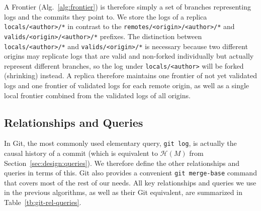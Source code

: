 \documentclass[9pt, oneside]{article}   	%
\begin{document}
A Frontier (Alg.~\ref{alg:frontier}) is therefore simply a set of branches representing logs and the commits they point to. We store the logs of a replica \texttt{locals/<author>/*} in contrast to the \texttt{remotes/<origin>/<author>/*} and \texttt{valids/<origin>/<author>/*} prefixes. The distinction between \texttt{locals/<author>/*} and \texttt{valids/<origin>/*} is necessary because two different origins may replicate logs that are valid and non-forked individually but actually represent different branches, so the log under \texttt{locals/<author>} will be forked (shrinking) instead. A replica therefore maintains one frontier of not yet validated logs and one frontier of validated logs for each remote origin, as well as a single local frontier combined from the validated logs of all origins.

\subsection{Relationships and Queries}
\label{sec:git-implementation:rel-queries}

In Git, the most commonly used elementary query, \texttt{git log}, is actually the causal history of a commit (which is equivalent to $\mathcal{H}(M)$ from Section~\ref{sec:design:queries}). We therefore define the other relationships and queries in terms of this. Git also provides a convenient \texttt{git merge-base} command that covers most of the rest of our needs. All key relationships and queries we use in the previous algorithms, as well as their Git equivalent, are summarized in Table~\ref{tb:git-rel-queries}.
\end{document}
